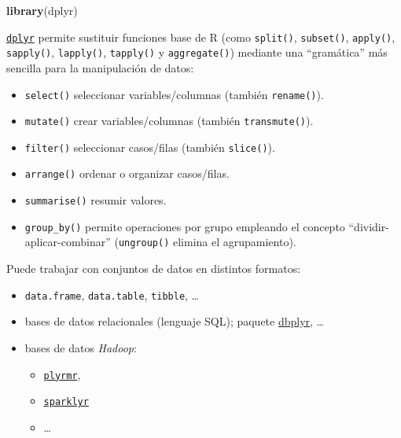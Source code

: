 \documentclass[]{book}
\newenvironment{Shaded}{\begin{snugshade}}{\end{snugshade}}
\newcommand{\KeywordTok}[1]{\textcolor[rgb]{0.13,0.29,0.53}{\textbf{#1}}}
\newcommand{\NormalTok}[1]{#1}
\begin{document}
\begin{Shaded}
\begin{Highlighting}[]
\KeywordTok{library}\NormalTok{(dplyr)}
\end{Highlighting}
\end{Shaded}

\href{https://dplyr.tidyverse.org/index.html}{\texttt{dplyr}} permite
sustituir funciones base de R (como \texttt{split()}, \texttt{subset()},
\texttt{apply()}, \texttt{sapply()}, \texttt{lapply()},
\texttt{tapply()} y \texttt{aggregate()}) mediante una ``gramática'' más
sencilla para la manipulación de datos:

\begin{itemize}
\item
  \texttt{select()} seleccionar variables/columnas (también
  \texttt{rename()}).
\item
  \texttt{mutate()} crear variables/columnas (también
  \texttt{transmute()}).
\item
  \texttt{filter()} seleccionar casos/filas (también \texttt{slice()}).
\item
  \texttt{arrange()} ordenar o organizar casos/filas.
\item
  \texttt{summarise()} resumir valores.
\item
  \texttt{group\_by()} permite operaciones por grupo empleando el
  concepto ``dividir-aplicar-combinar'' (\texttt{ungroup()} elimina el
  agrupamiento).
\end{itemize}

Puede trabajar con conjuntos de datos en distintos formatos:

\begin{itemize}
\item
  \texttt{data.frame}, \texttt{data.table}, \texttt{tibble}, \ldots{}
\item
  bases de datos relacionales (lenguaje SQL); paquete
  \href{https://dbplyr.tidyverse.org}{dbplyr}, \ldots{}
\item
  bases de datos \emph{Hadoop}:

  \begin{itemize}
  \item
    \href{https://github.com/RevolutionAnalytics/plyrmr/blob/master/docs/tutorial.md}{\texttt{plyrmr}},
  \item
    \href{https://spark.rstudio.com}{\texttt{sparklyr}}
  \item
    \ldots{}
  \end{itemize}
\end{itemize}
\end{document}
